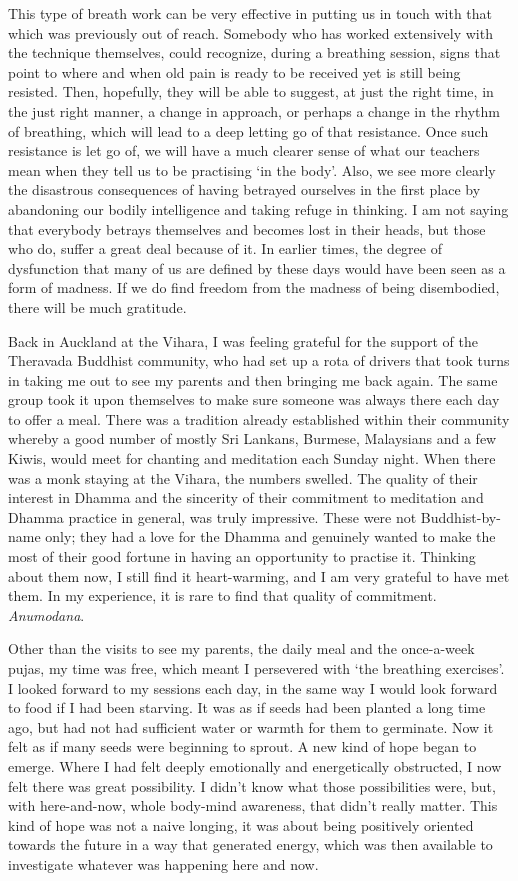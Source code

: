 This type of breath work can be very effective in putting us in touch
with that which was previously out of reach. Somebody who has worked
extensively with the technique themselves, could recognize, during a
breathing session, signs that point to where and when old pain is ready
to be received yet is still being resisted. Then, hopefully, they will
be able to suggest, at just the right time, in the just right manner, a
change in approach, or perhaps a change in the rhythm of breathing,
which will lead to a deep letting go of that resistance. Once such
resistance is let go of, we will have a much clearer sense of what our
teachers mean when they tell us to be practising `in the body'. Also, we
see more clearly the disastrous consequences of having betrayed
ourselves in the first place by abandoning our bodily intelligence and
taking refuge in thinking. I am not saying that everybody betrays
themselves and becomes lost in their heads, but those who do, suffer a
great deal because of it. In earlier times, the degree of dysfunction
that many of us are defined by these days would have been seen as a form
of madness. If we do find freedom from the madness of being disembodied,
there will be much gratitude.

Back in Auckland at the Vihara, I was feeling grateful for the support
of the Theravada Buddhist community, who had set up a rota of drivers
that took turns in taking me out to see my parents and then bringing me
back again. The same group took it upon themselves to make sure someone
was always there each day to offer a meal. There was a tradition already
established within their community whereby a good number of mostly Sri
Lankans, Burmese, Malaysians and a few Kiwis, would meet for chanting
and meditation each Sunday night. When there was a monk staying at the
Vihara, the numbers swelled. The quality of their interest in Dhamma and
the sincerity of their commitment to meditation and Dhamma practice in
general, was truly impressive. These were not Buddhist-by-name only;
they had a love for the Dhamma and genuinely wanted to make the most of
their good fortune in having an opportunity to practise it. Thinking
about them now, I still find it heart-warming, and I am very grateful to
have met them. In my experience, it is rare to find that quality of
commitment. \emph{Anumodana}.

Other than the visits to see my parents, the daily meal and the
once-a-week pujas, my time was free, which meant I persevered with `the
breathing exercises'. I looked forward to my sessions each day, in the
same way I would look forward to food if I had been starving. It was as
if seeds had been planted a long time ago, but had not had sufficient
water or warmth for them to germinate. Now it felt as if many seeds were
beginning to sprout. A new kind of hope began to emerge. Where I had
felt deeply emotionally and energetically obstructed, I now felt there
was great possibility. I didn't know what those possibilities were, but,
with here-and-now, whole body-mind awareness, that didn't really matter.
This kind of hope was not a naive longing, it was about being positively
oriented towards the future in a way that generated energy, which was
then available to investigate whatever was happening here and now.


